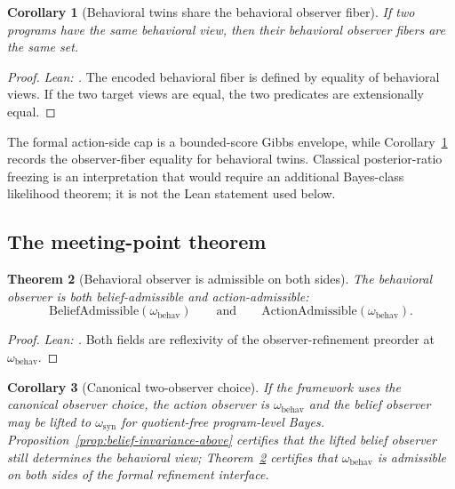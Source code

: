 \documentclass[11pt]{article}
\newtheorem{theorem}{Theorem}[section]
\newtheorem{corollary}[theorem]{Corollary}
\theoremstyle{definition}
\theoremstyle{remark}
\theoremstyle{plain}
\theoremstyle{definition}
\begin{document}
\begin{corollary}[Behavioral twins share the behavioral observer fiber]
\label{cor:twins-frozen-ratio}
If two programs have the same behavioral view, then their behavioral observer fibers are the same set.
\end{corollary}

\begin{proof}
\noindent\emph{Lean: .}
The encoded behavioral fiber is defined by equality of behavioral views. If the two target views are equal, the two predicates are extensionally equal.
\end{proof}

The formal action-side cap is a bounded-score Gibbs envelope, while Corollary~\ref{cor:twins-frozen-ratio} records the observer-fiber equality for behavioral twins. Classical posterior-ratio freezing is an interpretation that would require an additional Bayes-class likelihood theorem; it is not the Lean statement used below.

\subsection{The meeting-point theorem}
\label{sec:meeting-point}

\begin{theorem}[Behavioral observer is admissible on both sides]
\label{thm:meeting-point}
The behavioral observer is both belief-admissible and action-admissible:
\[
\mathrm{BeliefAdmissible}(\omega_{\mathrm{behav}})
\qquad\text{and}\qquad
\mathrm{ActionAdmissible}(\omega_{\mathrm{behav}}).
\]
\end{theorem}

\begin{proof}
\noindent\emph{Lean: .}
Both fields are reflexivity of the observer-refinement preorder at $\omega_{\mathrm{behav}}$.
\end{proof}

\begin{corollary}[Canonical two-observer choice]
\label{cor:canonical-pair}
If the framework uses the canonical observer choice, the action observer is $\omega_{\mathrm{behav}}$ and the belief observer may be lifted to $\omega_{\mathrm{syn}}$ for quotient-free program-level Bayes. Proposition~\ref{prop:belief-invariance-above} certifies that the lifted belief observer still determines the behavioral view; Theorem~\ref{thm:meeting-point} certifies that $\omega_{\mathrm{behav}}$ is admissible on both sides of the formal refinement interface.
\end{corollary}
\end{document}
